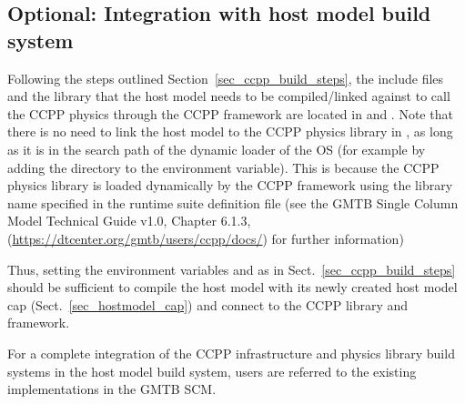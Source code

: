 \subsection{Optional: Integration with host model build system}
Following the steps outlined Section~\ref{sec_ccpp_build_steps}, the include files and the library  that the host model needs to be compiled/linked against to call the CCPP physics through the CCPP framework are located in  and . Note that there is no need to link the host model to the CCPP physics library in , as long as it is in the search path of the dynamic loader of the OS (for example by adding the directory  to the  environment variable). This is because the CCPP physics library is loaded dynamically by the CCPP framework using the library name specified in the runtime suite definition file (see the GMTB Single Column Model Technical Guide v1.0, Chapter 6.1.3, (\url{https://dtcenter.org/gmtb/users/ccpp/docs/}) for further information)

Thus, setting the environment variables  and  as in Sect.~\ref{sec_ccpp_build_steps} should be sufficient to compile the host model with its newly created host model cap (Sect.~\ref{sec_hostmodel_cap}) and connect to the CCPP library and framework.

For a complete integration of the CCPP infrastructure and physics library build systems in the host model build system, users are referred to the existing implementations in the GMTB SCM.

